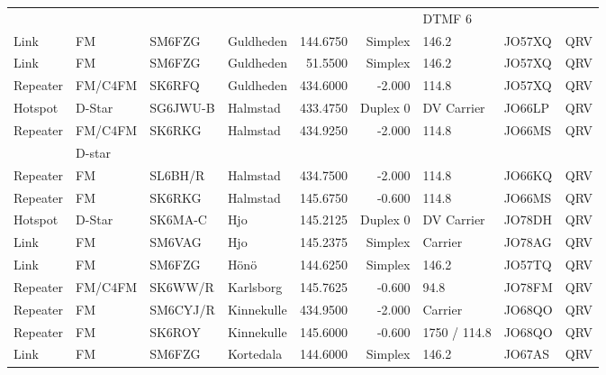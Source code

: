 \begin{longtable}{llllrrlll}
         &           &          &                   &              &            & DTMF 6       &             &          \\
Link     & FM        & SM6FZG   & Guldheden         & 144.6750     & Simplex    & 146.2        & JO57XQ      & QRV      \\
Link     & FM        & SM6FZG   & Guldheden         & 51.5500      & Simplex    & 146.2        & JO57XQ      & QRV      \\
Repeater & FM/C4FM   & SK6RFQ   & Guldheden         & 434.6000     & -2.000     & 114.8        & JO57XQ      & QRV      \\
Hotspot  & D-Star    & SG6JWU-B & Halmstad          & 433.4750     & Duplex 0   & DV Carrier   & JO66LP      & QRV      \\
Repeater & FM/C4FM   & SK6RKG   & Halmstad          & 434.9250     & -2.000     & 114.8        & JO66MS      & QRV      \\
         & D-star    &          &                   &              &            &              &             &          \\
Repeater & FM        & SL6BH/R  & Halmstad          & 434.7500     & -2.000     & 114.8        & JO66KQ      & QRV      \\
Repeater & FM        & SK6RKG   & Halmstad          & 145.6750     & -0.600     & 114.8        & JO66MS      & QRV      \\
Hotspot  & D-Star    & SK6MA-C  & Hjo               & 145.2125     & Duplex 0   & DV Carrier   & JO78DH      & QRV      \\
Link     & FM        & SM6VAG   & Hjo               & 145.2375     & Simplex    & Carrier      & JO78AG      & QRV      \\
Link     & FM        & SM6FZG   & Hönö              & 144.6250     & Simplex    & 146.2        & JO57TQ      & QRV      \\
Repeater & FM/C4FM   & SK6WW/R  & Karlsborg         & 145.7625     & -0.600     & 94.8         & JO78FM      & QRV      \\
Repeater & FM        & SM6CYJ/R & Kinnekulle        & 434.9500     & -2.000     & Carrier      & JO68QO      & QRV      \\
Repeater & FM        & SK6ROY   & Kinnekulle        & 145.6000     & -0.600     & 1750 / 114.8 & JO68QO      & QRV      \\
Link     & FM        & SM6FZG   & Kortedala         & 144.6000     & Simplex    & 146.2        & JO67AS      & QRV      \\

\end{longtable}
